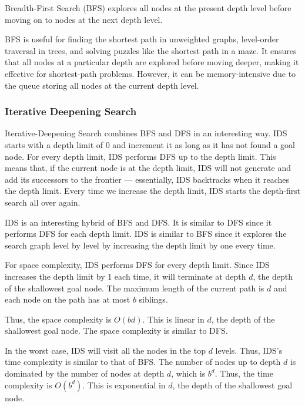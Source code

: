                 Breadth-First Search (BFS) explores all nodes at the present depth level before moving on to nodes at the next depth level.

                BFS is useful for finding the shortest path in unweighted graphs, level-order traversal in trees, and solving puzzles like the shortest path in a maze. It ensures that all nodes at a particular depth are explored before moving deeper, making it effective for shortest-path problems. However, it can be memory-intensive due to the queue storing all nodes at the current depth level.

            \subsubsection{Iterative Deepening Search}
            
                Iterative-Deepening Search combines BFS and DFS in an interesting way. IDS starts with a depth limit of 0 and increment it as long as it has not found a goal node. For every depth limit, IDS performs DFS up to the depth limit. This means that, if the current node is at the depth limit, IDS will not generate and add its successors to the frontier — essentially, IDS backtracks when it reaches the depth limit. Every time we increase the depth limit, IDS starts the depth-first search all over again.

                IDS is an interesting hybrid of BFS and DFS. It is similar to DFS since it performs DFS for each depth limit. IDS is similar to BFS since it explores the search graph level by level by increasing the depth limit by one every time.

                For space complexity, IDS performs DFS for every depth limit. Since IDS increases the depth limit by 1 each time, it will terminate at depth $d$, the depth of the shallowest goal node. The maximum length of the current path is $d$ and each node on the path has at most $b$ siblings.

                Thus, the space complexity is $O(bd)$. This is linear in $d$, the depth of the shallowest goal node. The space complexity is similar to DFS.

                In the worst case, IDS will visit all the nodes in the top $d$ levels. Thus, IDS’s time complexity is similar to that of BFS. The number of nodes up to depth $d$ is dominated by the number of nodes at depth $d$, which is $b^d$. Thus, the time complexity is $O(b^d)$. This is exponential in $d$, the depth of the shallowest goal node.

